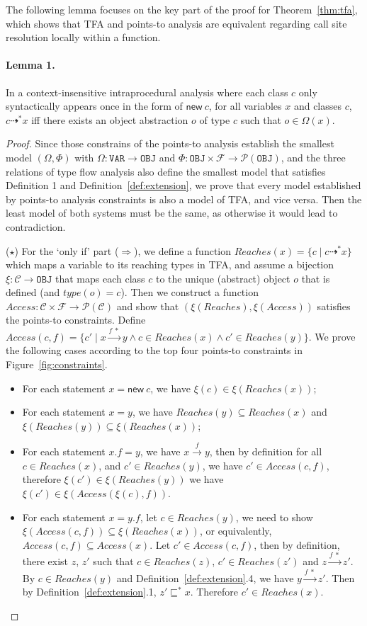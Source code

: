 \documentclass{fac}
\newcommand{\keyword}[1]{\mathsf{#1}}
\newcommand{\kwnew}[0]{\keyword{new}}
\newcommand\Var{\mathtt{VAR}}
\newcommand\Obj{\mathtt{OBJ}}
\newcommand{\VPT}{\Omega}
\newcommand{\HPT}{\Phi}
\newcommand{\Class}{\mathcal{C}}
\newcommand{\Field}{\mathcal{F}}
\newcommand{\less}{\sqsubseteq}
\newcommand{\tflow}{\dashrightarrow}
\newcommand{\hflow}{\longrightarrow}
\newcommand{\lhflow}[1]{\stackrel{#1}{\hflow}}
\newcommand\set[1]{\{#1\}}
\newcommand\power{\mathcal{P}}
\begin{document}
The following lemma focuses on the key part of the proof for Theorem~\ref{thm:tfa}, which shows that TFA and points-to analysis are equivalent regarding call site resolution locally within a function.

\paragraph{Lemma 1.}\label{lem:tfa-intra}
In a context-insensitive intraprocedural analysis where each class $c$ only syntactically appears once in the form of $\kwnew\ c$, for all variables $x$ and classes $c$, $c\tflow^*x$ iff there exists an object abstraction $o$ of type $c$ such that $o\in\VPT(x)$.
\begin{proof}
Since those constrains of the points-to analysis establish the smallest model $(\VPT, \HPT)$ with $\VPT:\Var\rightarrow\Obj$ and $\HPT:\Obj\times\Field\rightarrow\power(\Obj)$, and the three relations of type flow analysis also define the smallest model that satisfies Definition 1 and Definition~\ref{def:extension}, we prove that every model established by points-to analysis constraints is also a model of TFA, and vice versa. Then the least model of both systems must be the same, as otherwise it would lead to contradiction.

\medskip

($\star$) For the `only if' part ($\Rightarrow$), we define a function $Reaches(x)=\set{c\mid c\tflow^* x}$ which maps a variable to its reaching types in TFA, and assume a bijection $\xi:\Class\rightarrow\Obj$ that maps each class $c$ to the unique (abstract) object $o$ that is defined (and $type(o)=c$). Then we construct a function $Access:\Class\times\Field\rightarrow\power(\Class)$ and show that $(\xi(Reaches),\xi(Access))$ satisfies the points-to constraints. Define $Access(c,f)=\set{c'\mid x\lhflow{f\ *}y\wedge c\in Reaches(x)\wedge c'\in Reaches(y)}$. We prove the following cases according to the top four points-to constraints in Figure~\ref{fig:constraints}.
\begin{itemize}
\item For each statement $x = \kwnew\ c$, we have $\xi(c)\in\xi(Reaches(x))$;
\item For each statement $x = y$, we have $Reaches(y)\subseteq Reaches(x)$ and $\xi(Reaches(y))\subseteq\xi(Reaches(x))$;
\item For each statement $x.f = y$, we have $x\lhflow{f}y$, then by definition for all $c\in Reaches(x)$, and $c'\in Reaches(y)$, we have $c'\in Access(c,f)$, therefore $\xi(c')\in\xi(Reaches(y))$ we have $\xi(c')\in \xi(Access(\xi(c),f))$.
\item For each statement $x = y.f$, let $c\in Reaches(y)$, we need to show $\xi(Access(c,f))\subseteq\xi(Reaches(x))$, or equivalently, $Access(c,f)\subseteq Access(x)$. Let $c'\in Access(c,f)$, then by definition, there exist $z$, $z'$ such that $c\in Reaches(z)$, $c'\in Reaches(z')$ and $z\lhflow{f\ *}z'$. By $c\in Reaches(y)$ and Definition~\ref{def:extension}.4, we have $y\lhflow{f\ *}z'$. Then by Definition~\ref{def:extension}.1, $z'\less^*x$. Therefore $c'\in Reaches(x)$.
\end{itemize}


\end{proof}
\end{document}
